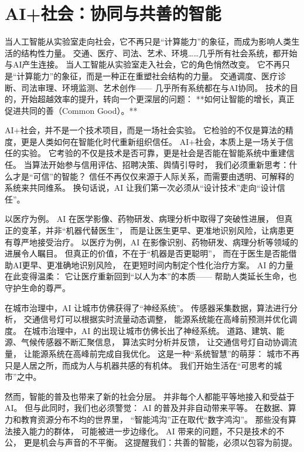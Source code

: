 \section{AI+社会：协同与共善的智能}

当人工智能从实验室走向社会，它不再只是“计算能力”的象征，而成为影响人类生活的结构性力量。  
交通、医疗、司法、艺术、环境……几乎所有社会系统，都开始与AI产生连接。  
当人工智能从实验室走入社会，它的角色悄然改变。  
它不再只是“计算能力”的象征，而是一种正在重塑社会结构的力量。  
交通调度、医疗诊断、司法审理、环境监测、艺术创作——  
几乎所有系统都在与AI协同。  
技术的目的，开始超越效率的提升，转向一个更深层的问题：  
**如何让智能的增长，真正促进共同的善（Common Good）。**

AI+社会，并不是一个技术项目，而是一场社会实验。  
它检验的不仅是算法的精度，更是人类如何在智能化时代重新组织信任。  
AI+社会，本质上是一场关于信任的实验。  
它考验的不仅是技术是否可靠，更是社会是否能在智能系统中重建信任。  
当算法开始参与信用评估、招聘决策、舆情引导时，  
我们必须重新思考：什么才是“可信”的智能？  
信任不再仅仅来源于人际关系，而需要由透明、可解释的系统来共同维系。  
换句话说，AI 让我们第一次必须从“设计技术”走向“设计信任”。

以医疗为例。  
AI 在医学影像、药物研发、病理分析中取得了突破性进展，  
但真正的变革，并非“机器代替医生”，  
而是让医生更早、更准地识别风险，让病患更有尊严地接受治疗。  
以医疗为例，AI 在影像识别、药物研发、病理分析等领域的进展令人瞩目。  
但真正的价值，不在于“机器是否更聪明”，  
而在于医生是否能借助AI更早、更准确地识别风险，  
在更短时间内制定个性化治疗方案。  
AI 的力量在此变得温柔：  
它让医疗重新回到“以人为本”的本质——  
帮助人类延长生命，也守护生命的尊严。

在城市治理中，AI 让城市仿佛获得了“神经系统”。  
传感器采集数据，算法进行分析，  
交通信号灯可以根据实时流量动态调整，  
能源系统能在高峰前预测并优化调度。  
在城市治理中，AI 的出现让城市仿佛长出了神经系统。  
道路、建筑、能源、气候传感器不断汇聚信息，  
算法实时分析并反馈，  
让交通信号灯自动协调流量，  
让能源系统在高峰前完成自我优化。  
这是一种“系统智慧”的萌芽：  
城市不再只是人居之所，而成为人与机器共感的有机体。  
我们开始生活在“可思考的城市”之中。

然而，智能的普及也带来了新的社会分层。  
并非每个人都能平等地接入和受益于AI。  
但与此同时，我们也必须警觉：  
AI 的普及并非自动带来平等。  
在数据、算力和教育资源分布不均的世界里，  
“智能鸿沟”正在取代“数字鸿沟”。  
那些没有算法接入能力的群体，  
可能被进一步边缘化。  
AI 带来的问题，不只是技术的不公，  
更是机会与声音的不平衡。  
这提醒我们：共善的智能，必须以包容为前提。

